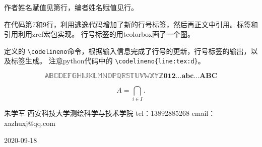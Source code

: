 \documentclass{article}
\makeatletter
\newcounter{codelineno}
\renewcommand*{\thecodelineno}{\codelinenobox[blue]{\arabic{codelineno}}}
\newcommand*{\codelineno}[2][]{%
  \edef\ref@temp{#1}%
  \ifx\ref@temp\@empty\relax%
  \stepcounter{codelineno}%
  \else%
  \setcounter{codelineno}{#1}%
  \fi%
  \makebox[0pt][c]{\hss\thecodelineno\hspace{10pt}}%
  \zlabel{#2}%
}
\makeatother
\begin{document}
作者姓名赋值见第行，编者姓名赋值见行。

在代码第7和9行，利用逃逸代码增加了新的行号标签，然后再正文中引用。标签和引用利用zref宏包实现。
行号标签的用tcolorbox画了一个圈。

定义的 \verb|\codelineno|命令，根据输入信息完成了行号的更新，行号标签的输出，以及标签生成。
注意python代码中的 \verb|\codelineno{line:tex:d}|。

$$
\mathbb{ABCDEFGHIJKLMNOPQRSTUVWXYZ}
\mathbf{012...abc...ABC}
$$

\[
  A=\bigcap_{i \in I }
.\]

朱学军
西安科技大学测绘科学与技术学院
tel：13892885268
email：xazhuxj@qq.com

2020-09-18
\end{document}
